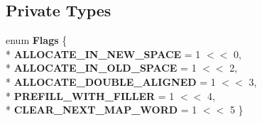 \subsection*{Private Types}
\begin{DoxyCompactItemize}
\item 
enum {\bfseries Flags} \{ \\*
{\bfseries A\+L\+L\+O\+C\+A\+T\+E\+\_\+\+I\+N\+\_\+\+N\+E\+W\+\_\+\+S\+P\+A\+CE} = 1 $<$$<$ 0, 
\\*
{\bfseries A\+L\+L\+O\+C\+A\+T\+E\+\_\+\+I\+N\+\_\+\+O\+L\+D\+\_\+\+S\+P\+A\+CE} = 1 $<$$<$ 2, 
\\*
{\bfseries A\+L\+L\+O\+C\+A\+T\+E\+\_\+\+D\+O\+U\+B\+L\+E\+\_\+\+A\+L\+I\+G\+N\+ED} = 1 $<$$<$ 3, 
\\*
{\bfseries P\+R\+E\+F\+I\+L\+L\+\_\+\+W\+I\+T\+H\+\_\+\+F\+I\+L\+L\+ER} = 1 $<$$<$ 4, 
\\*
{\bfseries C\+L\+E\+A\+R\+\_\+\+N\+E\+X\+T\+\_\+\+M\+A\+P\+\_\+\+W\+O\+RD} = 1 $<$$<$ 5
 \}\hypertarget{classv8_1_1internal_1_1_h_allocate_a6a722aa2fc1215c043fc589a0ff533df}{}\label{classv8_1_1internal_1_1_h_allocate_a6a722aa2fc1215c043fc589a0ff533df}

\end{DoxyCompactItemize}
